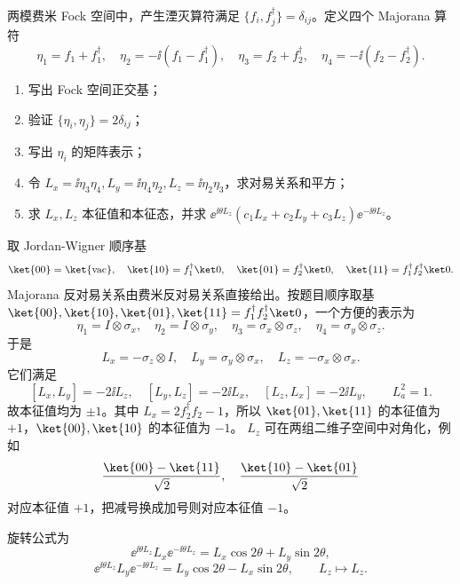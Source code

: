 \begin{question}
两模费米 Fock 空间中，产生湮灭算符满足 $\{f_i,f_j^\dagger\}=\delta_{ij}$。定义四个 Majorana 算符
\[
  \eta_1=f_1+f_1^\dagger,\quad \eta_2=-\ii(f_1-f_1^\dagger),
  \quad \eta_3=f_2+f_2^\dagger,\quad \eta_4=-\ii(f_2-f_2^\dagger).
\]
\begin{enumerate}
  \item 写出 Fock 空间正交基；
  \item 验证 $\{\eta_i,\eta_j\}=2\delta_{ij}$；
  \item 写出 $\eta_i$ 的矩阵表示；
  \item 令 $L_x=\ii\eta_3\eta_4,L_y=\ii\eta_4\eta_2,L_z=\ii\eta_2\eta_3$，求对易关系和平方；
  \item 求 $L_x,L_z$ 本征值和本征态，并求 $\ee^{\ii\theta L_z}(c_1L_x+c_2L_y+c_3L_z)\ee^{-\ii\theta L_z}$。
\end{enumerate}
\begin{solution}
取 Jordan-Wigner 顺序基
\[
  \ket{00}=\ket{\mathrm{vac}},
  \quad \ket{10}=f_1^\dagger\ket0,
  \quad \ket{01}=f_2^\dagger\ket0,
  \quad \ket{11}=f_1^\dagger f_2^\dagger\ket0.
\]
Majorana 反对易关系由费米反对易关系直接给出。按题目顺序取基 $\ket{00},\ket{10},\ket{01},\ket{11}=f_1^\dagger f_2^\dagger\ket0$，一个方便的表示为
\[
  \eta_1=I\otimes\sigma_x,
  \quad \eta_2=I\otimes\sigma_y,
  \quad \eta_3=\sigma_x\otimes\sigma_z,
  \quad \eta_4=\sigma_y\otimes\sigma_z.
\]
于是
\[
  L_x=-\sigma_z\otimes I,
  \quad L_y=\sigma_y\otimes\sigma_x,
  \quad L_z=-\sigma_x\otimes\sigma_x .
\]
它们满足
\[
  [L_x,L_y]=-2\ii L_z,
  \quad [L_y,L_z]=-2\ii L_x,
  \quad [L_z,L_x]=-2\ii L_y,
  \qquad L_a^2=1.
\]
故本征值均为 $\pm1$。其中 $L_x=2f_2^\dagger f_2-1$，所以 $\ket{01},\ket{11}$ 的本征值为 $+1$，$\ket{00},\ket{10}$ 的本征值为 $-1$。
$L_z$ 可在两组二维子空间中对角化，例如
\[
  {\ket{00}-\ket{11}\over\sqrt2},\quad {\ket{10}-\ket{01}\over\sqrt2}
\]
对应本征值 $+1$，把减号换成加号则对应本征值 $-1$。

旋转公式为
\[
  \ee^{\ii\theta L_z}L_x\ee^{-\ii\theta L_z}=L_x\cos2\theta+L_y\sin2\theta,
\]
\[
  \ee^{\ii\theta L_z}L_y\ee^{-\ii\theta L_z}=L_y\cos2\theta-L_x\sin2\theta,
  \qquad L_z\mapsto L_z.
\]
\end{solution}
\end{question}
